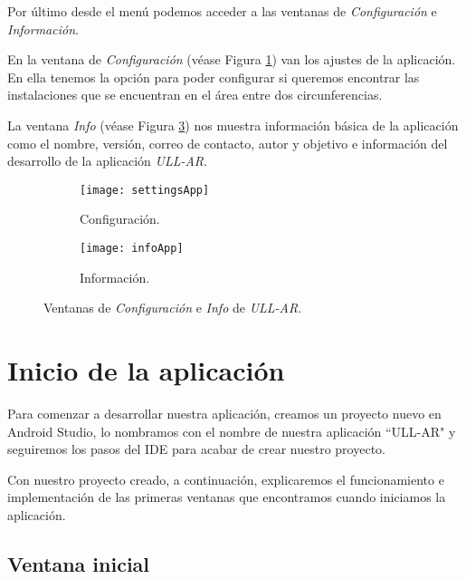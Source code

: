 
Por último desde el menú podemos acceder a las ventanas de \textit{Configuración} e \textit{Información}.

En la ventana de \textit{Configuración} (véase Figura \ref{fig:settingsApp}) van los ajustes de la aplicación. En ella tenemos la opción para poder configurar si queremos encontrar las instalaciones que se encuentran en el área entre dos circunferencias.

La ventana \textit{Info} (véase Figura \ref{fig:infoApp}) nos muestra información básica de la aplicación como el nombre, versión, correo de contacto, autor y objetivo e información del desarrollo de la aplicación \textit{ULL-AR}. 

\begin{figure}[h]
    \hspace*{\fill}%
    \begin{subfigure}[h]{0.35\linewidth}
    \texttt{[image: settingsApp]}
    \caption{Configuración.}
    \label{fig:settingsApp}
    \end{subfigure}
    \hfill%
    \begin{subfigure}[h]{0.35\linewidth}
    \texttt{[image: infoApp]}
    \caption{Información.}
    \label{fig:infoApp}
    \end{subfigure}%
    \caption{Ventanas de \textit{Configuración} e \textit{Info} de \textit{ULL-AR}.}
    \hspace*{\fill}%
\end{figure}

\section{Inicio de la aplicación} \label{chap:StartApplication} 

Para comenzar a desarrollar nuestra aplicación, creamos un proyecto nuevo en Android Studio, lo nombramos con el nombre de nuestra aplicación ``ULL-AR" y seguiremos los pasos del IDE para acabar de crear nuestro proyecto. 

Con nuestro proyecto creado, a continuación, explicaremos el funcionamiento e implementación de las primeras ventanas que encontramos cuando iniciamos la aplicación.


\subsection{Ventana inicial}

